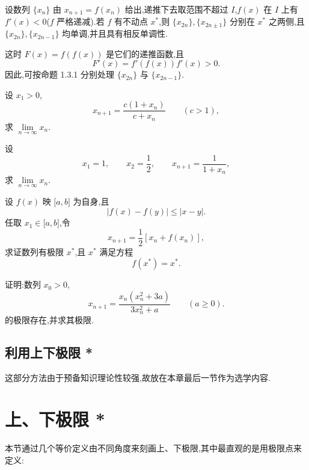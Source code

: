 \documentclass[../数学分析培优讲义.tex]{subfiles}
\begin{document}
\begin{proposition}[\markstar]
设数列 $\{x_n\}$ 由 $x_{n+1}=f(x_n)$ 给出,递推下去取范围不超过 $I$,$f(x)$ 在 $I$ 上有 $f'(x)<0$($f$ 严格递减).若 $f$ 有不动点 $x^*$,则 $\{x_{2n}\},\{x_{2n\pm1}\}$ 分别在 $x^*$ 之两侧,且 $\{x_{2n}\},\{x_{2n-1}\}$ 均单调,并且具有相反单调性.
\end{proposition}

\begin{remark}
这时 $F(x)=f(f(x))$ 是它们的递推函数,且
\[
F'(x)=f'(f(x))f'(x)>0.
\]
因此,可按命题 1.3.1 分别处理 $\{x_{2n}\}$ 与 $\{x_{2n-1}\}$.
\end{remark}

\begin{example}
设 $x_1>0$,
\[
x_{n+1}=\dfrac{c(1+x_n)}{c+x_n}\qquad(c>1),
\]
求 $\displaystyle \lim\limits_{n\to\infty}x_n$.
\end{example}
\exampleblank

\begin{example}
设
\[
x_1=1,
\qquad
x_2=\dfrac{1}{2},
\qquad
x_{n+1}=\dfrac{1}{1+x_n},
\]
求 $\displaystyle \lim\limits_{n\to\infty}x_n$.
\end{example}
\exampleblank

\begin{example}
设 $f(x)$ 映 $\lbrack a,b\rbrack$ 为自身,且
\[
|f(x)-f(y)|\leq|x-y|.
\]
任取 $x_1\in\lbrack a,b\rbrack$,令
\[
x_{n+1}=\dfrac{1}{2}[x_n+f(x_n)],
\]
求证数列有极限 $x^*$,且 $x^*$ 满足方程
\[
f(x^*)=x^*.
\]
\end{example}
\exampleblank

\begin{example}
证明:数列 $x_0>0$,
\[
x_{n+1}=\dfrac{x_n(x_n^2+3a)}{3x_n^2+a}\qquad(a\geq0).
\]
的极限存在,并求其极限.
\end{example}
\exampleblank


\newpage

\subsection{利用上下极限 *}

这部分方法由于预备知识理论性较强,故放在本章最后一节作为选学内容.


\newpage

\section{上、下极限 *}

本节通过几个等价定义由不同角度来刻画上、下极限,其中最直观的是用极限点来定义:
\end{document}
